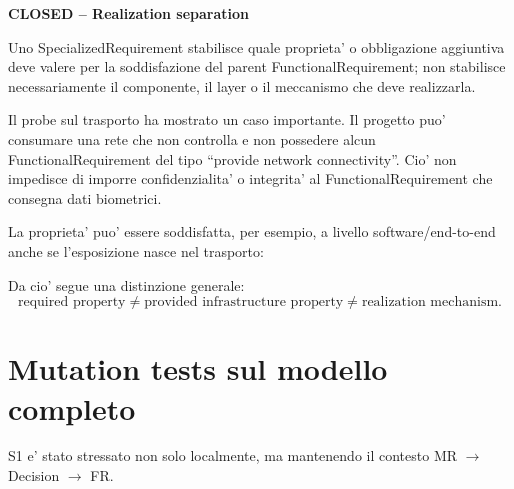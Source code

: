\documentclass[11pt,a4paper]{article}
\newcommand{\closed}{\textbf{CLOSED}}
\newenvironment{statusbox}[1]{%
  \def\FrameCommand{\fcolorbox{ddtablue}{ddtagray}}%
  \MakeFramed{\advance\hsize-2\width\FrameRestore}
  \noindent\textbf{#1}\par\smallskip
}{\endMakeFramed}
\begin{document}
\begin{statusbox}{\closed{} -- Realization separation}
Uno SpecializedRequirement stabilisce quale proprieta' o obbligazione aggiuntiva deve valere per la soddisfazione del parent FunctionalRequirement; non stabilisce necessariamente il componente, il layer o il meccanismo che deve realizzarla.
\end{statusbox}

Il probe sul trasporto ha mostrato un caso importante. Il progetto puo' consumare una rete che non controlla e non possedere alcun FunctionalRequirement del tipo ``provide network connectivity''. Cio' non impedisce di imporre confidenzialita' o integrita' al FunctionalRequirement che consegna dati biometrici.

La proprieta' puo' essere soddisfatta, per esempio, a livello software/end-to-end anche se l'esposizione nasce nel trasporto:

\begin{center}
\end{center}

Da cio' segue una distinzione generale:
\[
  \text{required property} \neq \text{provided infrastructure property} \neq \text{realization mechanism}.
\]

\section{Mutation tests sul modello completo}

S1 e' stato stressato non solo localmente, ma mantenendo il contesto MR $\rightarrow$ Decision $\rightarrow$ FR.
\end{document}
